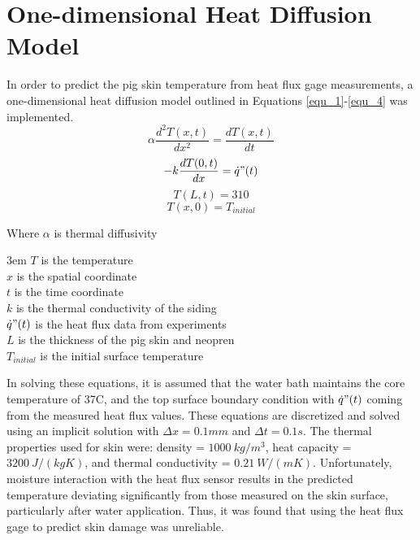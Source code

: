 \clearpage		\large
\chapter{One-dimensional Heat Diffusion Model} \label{App:1D_Heat_Diffusion}

 In order to predict the pig skin temperature from heat flux gage measurements, a one-dimensional heat diffusion model outlined in Equations \ref{equ_1}-\ref{equ_4} was implemented.
 \begin{equation} \label{equ_1} \alpha \frac{d^2T(x,t)}{dx^2} = \frac{dT(x,t)}{dt} \end{equation}
 \begin{equation} \label{equ_2} -k\frac{dT(0,t)}{dx} = \dot{q}"(t) \end{equation}
 \begin{equation} \label{equ_3} T(L,t) = 310 \end{equation}
 \begin{equation} \label{equ_4} T(x,0) = T_{initial} \end{equation}

Where $\alpha$ is thermal diffusivity

\noindent\hangindent3em
$T$ is the temperature\\
$x$ is the spatial coordinate\\
$t$ is the time coordinate\\
$k$ is the thermal conductivity of the siding\\
$\dot{q}"(t)$ is the heat flux data from experiments\\
$L$ is the thickness of the pig skin and neopren\\
$T_{initial}$ is the initial surface temperature\

In solving these equations, it is assumed that the water bath maintains the core temperature of 37\textdegree C, and the top surface boundary condition with $\dot{q}"(t)$ coming from the measured heat flux values. These equations are discretized and solved using an implicit solution with $\Delta x=0.1 mm$ and $\Delta t=0.1 s$. The thermal properties used for skin were: density = $1000\ kg/m^3$, heat capacity = $3200\ J/(kgK)$, and thermal conductivity = $0.21\ W/(mK)$. Unfortunately, moisture interaction with the heat flux sensor results in the predicted temperature deviating significantly from those measured on the skin surface, particularly after water application.  Thus, it was found that using the heat flux gage to predict skin damage was unreliable.

